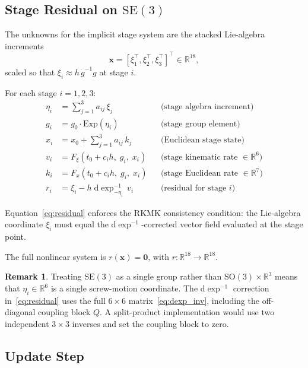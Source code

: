 \documentclass[a4paper,10pt]{article}
\newcommand{\SO}{\mathrm{SO}(3)}
\newcommand{\SE}{\mathrm{SE}(3)}
\newcommand{\Exp}{\mathrm{Exp}}
\newcommand{\dexp}{\mathrm{d}\exp}
\newcommand{\R}{\mathbb{R}}
\theoremstyle{definition}
\newtheorem{remark}{Remark}
\begin{document}
\subsection{Stage Residual on $\SE$}

The unknowns for the implicit stage system are the stacked Lie-algebra
increments
\begin{equation}
  \mathbf{x} = [\xi_1^\top, \xi_2^\top, \xi_3^\top]^\top \in \R^{18},
  \label{eq:stage_unknown}
\end{equation}
scaled so that $\xi_i \approx h\,\dot{g}^{-1}g$ at stage $i$.

For each stage $i = 1,2,3$:
\begin{align}
  \eta_i &= \textstyle\sum_{j=1}^{3} a_{ij}\,\xi_j
    & &\text{(stage algebra increment)}\label{eq:stage_eta}\\
  g_i    &= g_0 \cdot \Exp(\eta_i)
    & &\text{(stage group element)}\label{eq:stage_g}\\
  x_i    &= x_0 + \textstyle\sum_{j=1}^{3} a_{ij}\,k_j
    & &\text{(Euclidean stage state)}\label{eq:stage_x}\\
  v_i    &= F_\xi\!\left(t_0 + c_i h,\; g_i,\; x_i\right)
    & &\text{(stage kinematic rate $\in \R^6$)}\label{eq:stage_v}\\
  k_i    &= F_x\!\left(t_0 + c_i h,\; g_i,\; x_i\right)
    & &\text{(stage Euclidean rate $\in \R^7$)}\label{eq:stage_k}\\
  r_i    &= \xi_i - h\;\dexp^{-1}_{-\eta_i}\,v_i
    & &\text{(residual for stage $i$)}\label{eq:residual}
\end{align}

Equation~\eqref{eq:residual} enforces the RKMK consistency condition: the
Lie-algebra coordinate $\xi_i$ must equal the $\dexp^{-1}$-corrected vector
field evaluated at the stage point.

The full nonlinear system is $r(\mathbf{x}) = \mathbf{0}$, with
$r : \R^{18} \to \R^{18}$.

\begin{remark}
Treating $\SE$ as a single group rather than $\SO \times \R^3$ means that
$\eta_i \in \R^6$ is a single screw-motion coordinate.  The $\dexp^{-1}$
correction in~\eqref{eq:residual} uses the full $6 \times 6$
matrix~\eqref{eq:dexp_inv}, including the off-diagonal coupling block $Q$.  A
split-product implementation would use two independent $3 \times 3$ inverses
and set the coupling block to zero.
\end{remark}

\subsection{Update Step}
\end{document}
